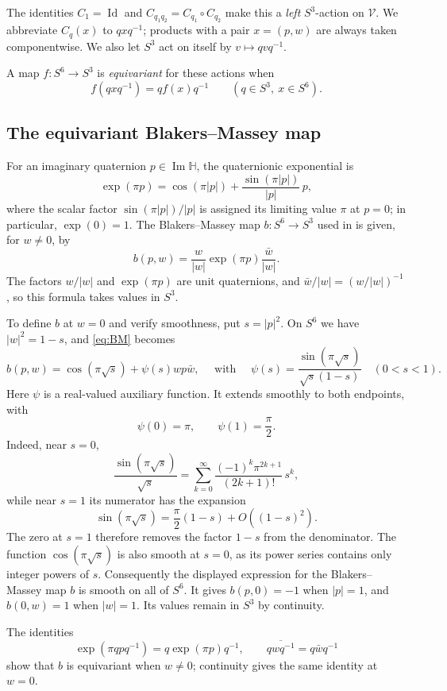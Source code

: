 \documentclass[12pt]{amsart}
\numberwithin{equation}{section}
\theoremstyle{remark}
\newcommand{\Hh}{\mathbb H}
\newcommand{\Id}{\operatorname{Id}}
\begin{document}
The identities
\(C_1=\Id\) and \(C_{q_1q_2}=C_{q_1}\circ C_{q_2}\) make this a
\textit{left} \(S^3\)-action on $\mathcal V$. We abbreviate \(C_q(x)\) to \(qxq^{-1}\);
products with a pair \(x=(p,w)\) are always taken componentwise. We also let \(S^3\) act on itself by \(v\mapsto qvq^{-1}\).

A map \(f:S^6\to S^3\) is \emph{equivariant} for these actions when
\[
 f(qxq^{-1})=qf(x)q^{-1}
 \qquad(q\in S^3,\ x\in S^6).
\]

\subsection{The equivariant Blakers--Massey map}
For an imaginary quaternion \(p \in \operatorname{Im}\Hh \), the quaternionic exponential is
\[
 \exp(\pi p)=\cos(\pi|p|)
       +\frac{\sin(\pi|p|)}{|p|}\,p,
\]
where the scalar factor \(\sin(\pi|p|)/|p|\) is assigned its limiting
value \(\pi\) at \(p=0\); in particular, \(\exp(0)=1\).
The Blakers--Massey map \(b:S^6\to S^3\) used in
\cite{DMR,DPR} is given, for \(w\ne0\), by
\begin{equation}\label{eq:BM}
b(p,w)=\frac{w}{|w|}\exp(\pi p)\frac{\bar w}{|w|}.
\end{equation}
The factors \(w/|w|\) and \(\exp(\pi p)\) are unit quaternions,
and \(\bar w/|w|=(w/|w|)^{-1}\), so this formula takes values in
\(S^3\).

To define \(b\) at \(w=0\) and verify smoothness, put \(s=|p|^2\).
On \(S^6\) we have \(|w|^2=1-s\), and \eqref{eq:BM} becomes
\[
 b(p,w)=\cos(\pi\sqrt s)+\psi(s)wp\bar w,
 \quad \text{ with }\quad
 \psi(s)=\frac{\sin(\pi\sqrt s)}{\sqrt s(1-s)}
 \quad(0<s<1).
\]
Here \(\psi\) is a real-valued auxiliary function. It extends
smoothly to both endpoints, with
\[
 \psi(0)=\pi,\qquad \psi(1)=\frac\pi2.
\]
Indeed, near \(s=0\),
\[
 \frac{\sin(\pi\sqrt s)}{\sqrt s}
 =\sum_{k=0}^{\infty}
     \frac{(-1)^k\pi^{2k+1}}{(2k+1)!}\,s^k,
\]
while near \(s=1\) its numerator has the expansion
\[
 \sin(\pi\sqrt s)=\frac\pi2(1-s)+O((1-s)^2).
\]
The zero at \(s=1\) therefore removes the factor \(1-s\) from the
denominator. The function \(\cos(\pi\sqrt s)\) is also smooth at
\(s=0\), as its power series contains only integer powers of \(s\).
Consequently the displayed expression for the Blakers--Massey map \(b\) is smooth on all
of \(S^6\). It gives \(b(p,0)=-1\) when \(|p|=1\), and
\(b(0,w)=1\) when \(|w|=1\). Its values remain in \(S^3\) by
continuity.

The identities
\[
 \exp(\pi qpq^{-1})=q\exp(\pi p)q^{-1},
 \qquad \overline{qwq^{-1}}=q\bar wq^{-1}
\]
show that \(b\) is equivariant when \(w\ne0\); continuity gives
the same identity at \(w=0\).
\end{document}
